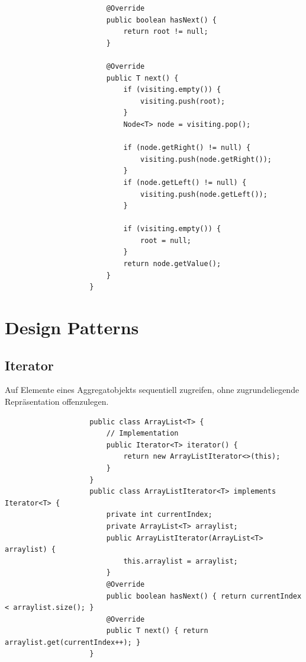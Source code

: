 \documentclass[a4paper, landscape, 8pt]{scrartcl}
\begin{document}
\begin{multicols*}{4}
\begin{lstlisting}
                        @Override
                        public boolean hasNext() {
                            return root != null;
                        }

                        @Override
                        public T next() {
                            if (visiting.empty()) {
                                visiting.push(root);
                            }
                            Node<T> node = visiting.pop();

                            if (node.getRight() != null) {
                                visiting.push(node.getRight());
                            }
                            if (node.getLeft() != null) {
                                visiting.push(node.getLeft());
                            }

                            if (visiting.empty()) {
                                root = null;
                            }
                            return node.getValue();
                        }
                    }
                    \end{lstlisting}

        \section{Design Patterns}
            \subsection{Iterator}
                Auf Elemente eines Aggregatobjekts sequentiell zugreifen, ohne zugrundeliegende Repräsentation offenzulegen.\\
                \begin{lstlisting}
                    public class ArrayList<T> {
                        // Implementation
                        public Iterator<T> iterator() {
                            return new ArrayListIterator<>(this);
                        }
                    }
                    public class ArrayListIterator<T> implements Iterator<T> {
                        private int currentIndex;
                        private ArrayList<T> arraylist;
                        public ArrayListIterator(ArrayList<T> arraylist) {
                            this.arraylist = arraylist;
                        }
                        @Override
                        public boolean hasNext() { return currentIndex < arraylist.size(); }
                        @Override
                        public T next() { return arraylist.get(currentIndex++); }
                    }
                \end{lstlisting}

\end{multicols*}
\end{document}
